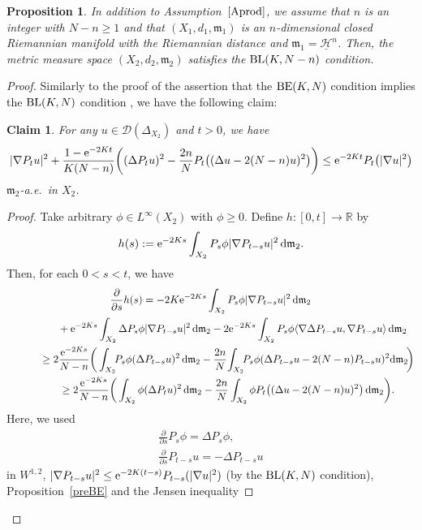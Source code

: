 \documentclass[pdftex]{sigma}
\numberwithin{equation}{section}
\newtheorem{Prop}[Thm]{Proposition}
\newtheorem{Clm}[Thm]{Claim}
\theoremstyle{definition}
\newcommand{\R}{\mathbb{R}}
\newcommand{\mf}{\mathfrak{m}}
\newcommand{\BE}{{\rm BE}}
\newcommand{\BL}{{\rm BL}}
\newcommand{\nHa}{\underline{\mathcal{H}}}
\newcommand{\D}{\mathcal{D}}
\begin{document}
\begin{Prop}\label{blN-n}
In addition to Assumption~$\ref{Aprod}$, we assume that $n$ is an integer with $N-n\geq 1$ and that $(X_1,d_1,\mf_1)$ is an $n$-dimensional closed Riemannian manifold with the Riemannian distance and $\mf_1=\nHa^n$.
Then, the metric measure space $(X_2,d_2,\mf_2)$ satisfies the $\BL(K,N-n)$ condition.
\end{Prop}
\begin{proof}
Similarly to the proof of the assertion that the $\BE(K,N)$ condition implies the $\BL(K,N)$ condition \cite[Proposition~4.9]{EKS}, we have the following claim:
\begin{Clm}\label{blmod}
For any $u\in\D(\Delta_{X_2})$ and $t>0$, we have
\[
|\nabla P_t u|^2+\frac{1-{\rm e}^{-2Kt}}{K(N-n)}\bigg((\Delta P_t u)^2-\frac{2n}{N}P_t\big((\Delta u-2(N-n)u)^2\big)\bigg)\leq {\rm e}^{-2Kt}P_t\big(|\nabla u|^2\big)
\]
$\mf_2$-a.e.\ in $X_2$.
\end{Clm}
\begin{proof}
Take arbitrary $\phi\in L^\infty(X_2)$ with $\phi\geq 0$.
Define $h\colon [0,t]\to \R$ by
\[
h(s):={\rm e}^{-2Ks} \int_{X_2} P_s\phi|\nabla P_{t-s} u|^2\,{\rm d}\mf_2.
\]
Then, for each $0<s<t$, we have
\begin{gather*}
\frac{\partial}{\partial s} h(s)
=-2K {\rm e}^{-2 K s}\int_{X_2} P_s \phi|\nabla P_{t-s} u|^2\,{\rm d}\mf_2
\\ \hphantom{\frac{\partial}{\partial s} h(s)=}
{}+{\rm e}^{-2K s}\int_{X_2} \Delta P_s \phi |\nabla P_{t-s} u|^2\,{\rm d}\mf_2
-2 {\rm e}^{-2K s}\int_{X_2} P_s\phi\langle\nabla \Delta P_{t-s} u,\nabla P_{t-s}u \rangle\,{\rm d}\mf_2
\\ \hphantom{\frac{\partial}{\partial s} h(s)}
{}\geq 2 \frac{{\rm e}^{-2K s}}{N-n}\bigg(\int_{X_2}\!\!P_s \phi (\Delta P_{t-s} u)^2\,{\rm d}\mf_2
-\frac{2n}{N}\!\int_{X_2}\!\!P_s \phi (\Delta P_{t-s} u-2(N-n)P_{t-s} u)^2{\rm d}\mf_2 \!\bigg)
\\ \hphantom{\frac{\partial}{\partial s} h(s)}
{}\geq 2 \frac{{\rm e}^{-2K s}}{N-n}\bigg(\int_{X_2}\phi (\Delta P_{t} u)^2\,{\rm d}\mf_2
-\frac{2n}{N}\int_{X_2} \phi P_t\big((\Delta u-2(N-n)u)^2\big)\,{\rm d}\mf_2 \bigg).
\end{gather*}
Here, we used
\begin{gather*}
\frac{\partial}{\partial s} P_s \phi=\Delta P_s \phi,
\\
\frac{\partial }{\partial s}P_{t-s} u= -\Delta P_{t-s} u
\end{gather*}
in $W^{1,2}$, $|\nabla P_{t-s} u|^2\leq {\rm e}^{-2K (t-s)}P_{t-s}(|\nabla u|^2)$ (by the $\BL(K,N)$ condition), Proposition~\ref{preBE} and the Jensen inequality

\end{proof}
\end{proof}
\end{document}
